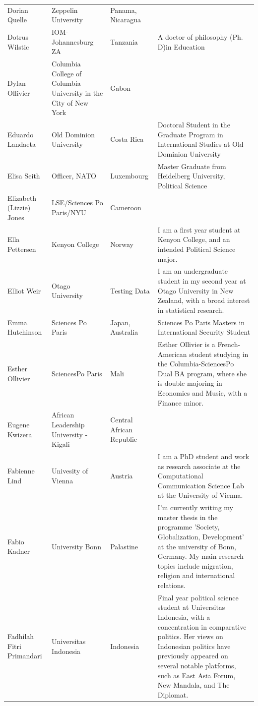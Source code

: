 \documentclass[]{article}
\begin{document}
\begin{longtable}{l>{\raggedright\arraybackslash}p{2cm}>{\raggedright\arraybackslash}p{2cm}>{\raggedright\arraybackslash}p{3cm}}
Dorian Quelle & Zeppelin University & Panama, Nicaragua & \\
\rowcolor{gray!6}  Dotrus Wilstic & IOM- Johannesburg ZA & Tanzania & A doctor of philosophy (Ph. D)in Education\\
\addlinespace
Dylan Ollivier & Columbia College of Columbia University in the City of New York & Gabon & \\
\rowcolor{gray!6}  Eduardo Landaeta & Old Dominion University & Costa Rica & Doctoral Student in the Graduate Program in International Studies at Old Dominion University\\
Elisa Seith & Officer, NATO & Luxembourg & Master Graduate from Heidelberg University, Political Science\\
\rowcolor{gray!6}  Elizabeth (Lizzie) Jones & LSE/Sciences Po Paris/NYU & Cameroon & \\
Ella Pettersen & Kenyon College & Norway & I am a first year student at Kenyon College, and an intended Political Science major.\\
\addlinespace
\rowcolor{gray!6}  Elliot Weir & Otago University & Testing Data & I am an undergraduate student in my second year at Otago University in New Zealand, with a broad interest in statistical research.\\
Emma Hutchinson & Sciences Po Paris & Japan, Australia & Sciences Po Paris Masters in International Security Student\\
\rowcolor{gray!6}  Esther Ollivier & SciencesPo Paris & Mali & Esther Ollivier is a French-American student studying in the Columbia-SciencesPo Dual BA program, where she is double majoring in Economics and Music, with a Finance minor.\\
Eugene Kwizera & African Leadership University - Kigali & Central African Republic & \\
\rowcolor{gray!6}  Fabienne Lind & Univesity of Vienna & Austria & I am a PhD student and work as research associate at the Computational Communication Science Lab at the University of Vienna.\\
\addlinespace
Fabio Kadner & University Bonn & Palastine & I'm currently writing my master thesis in the programme 'Society, Globalization, Development' at the university of Bonn, Germany. My main research topics include migration, religion and international relations.\\
\rowcolor{gray!6}  Fadhilah Fitri Primandari & Universitas Indonesia & Indonesia & Final year political science student at Universitas Indonesia, with a concentration in comparative politics. Her views on Indonesian politics have previously appeared on several notable platforms, such as East Asia Forum, New Mandala, and The Diplomat.\\

\end{longtable}
\end{document}
